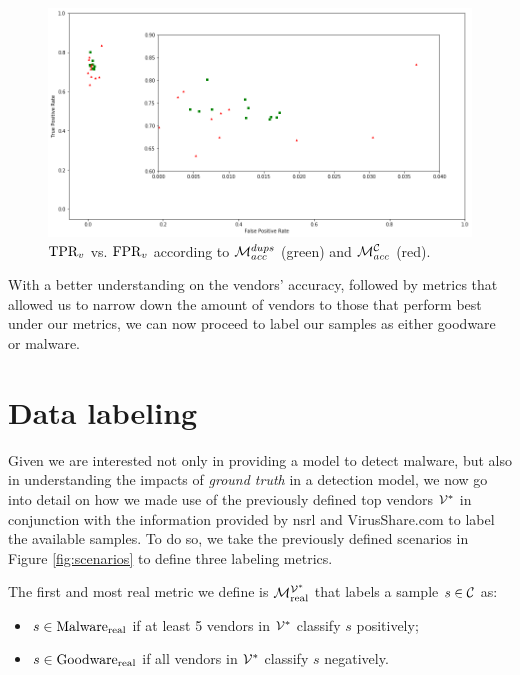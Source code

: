 \begin{figure}[!h]
	\centering
	\includegraphics[width=\textwidth]{Figures/dr_fpr_top.png}
	\caption{$\textrm{TPR}_v$ vs. $\textrm{FPR}_v$ according to $\mathcal{M}_{acc}^{{dups}}$ (green) and $\mathcal{M}_{acc}^{\mathcal{C}}$ (red).}
	\label{fig:dr_fpr_top}
\end{figure}

With a better understanding on the vendors' accuracy, followed by metrics that allowed us to narrow down the amount of vendors to those that perform best under our metrics, we can now proceed to label our samples as either goodware or malware.

\section{Data labeling}
\label{section:data_labeling}

Given we are interested not only in providing a model to detect malware, but also in understanding the impacts of \textit{ground truth} in a detection model, we now go into detail on how we made use of the previously defined top vendors $\mathcal{V}^*$ in conjunction with the information provided by \gls{nsrl} and VirusShare.com to label the available samples.
To do so, we take the previously defined scenarios in Figure \ref{fig:scenarios} to define three labeling metrics.

The first and most real metric we define is $\mathcal{M}_{\mathrm{real}}^{\mathcal{V}^*}$ that labels a sample $s\in\mathcal{C}$ as:

\begin{itemize}
	\item $s\in\mathrm{Malware}_{\mathrm{real}}$ if at least 5 vendors in $\mathcal{V}^*$ classify $s$ positively;
	\item $s\in\mathrm{Goodware}_{\mathrm{real}}$ if all vendors in $\mathcal{V}^*$ classify $s$ negatively.
\end{itemize}

